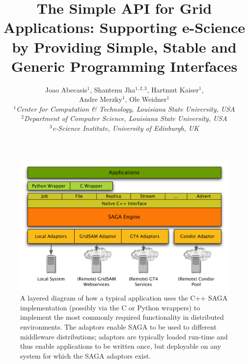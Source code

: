\documentclass[a4paper,10pt]{article}
\begin{document}
\title{\large The Simple API for Grid Applications: Supporting
  e-Science by Providing Simple, Stable and Generic Programming
  Interfaces}

\author{Joao Abecasis$^{1}$, Shantenu Jha$^{1,2,3}$, Hartmut Kaiser$^{1}$, \\ Andre Merzky$^{1}$, Ole Weidner$^{1}$ \\
  \small{\emph{$^{1}$Center for Computation \& Technology, Louisiana State University, USA}}\\
  \small{\emph{$^{2}$Department of Computer Science, Louisiana State
      University, USA}}\\
  \small{\emph{$^{3}$e-Science Institute, University of Edinburgh, UK}}}

\maketitle

\begin{figure}
\begin{center}
\includegraphics[scale=0.60]{saga_layer_arch}
\end{center}
\caption{A layered diagram of how a typical application uses the C++ SAGA implementation (possibly via the C or Python wrappers) to implement the most commonly  required functionality in distributed environments. The adaptors enable SAGA to be used to different middleware distributions; adaptors are typically loaded run-time and thus enable applications to be written once, but deployable on any system for
which the SAGA adaptors exist.}
\label{fig:saga_arch}
\end{figure}
\end{document}
